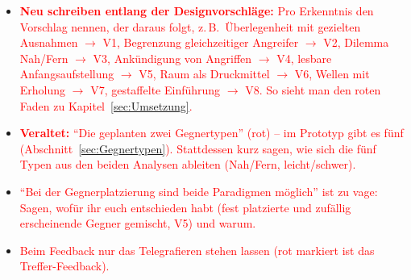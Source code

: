 \documentclass[../Main.tex]{subfiles}
\begin{document}
\begin{itemize}[leftmargin=1.5cm]
    \item \textcolor{red}{\textbf{Neu schreiben entlang der Designvorschläge:} Pro Erkenntnis den Vorschlag nennen, der daraus folgt, z.\,B.\ Überlegenheit mit gezielten Ausnahmen $\rightarrow$ V1, Begrenzung gleichzeitiger Angreifer $\rightarrow$ V2, Dilemma Nah/Fern $\rightarrow$ V3, Ankündigung von Angriffen $\rightarrow$ V4, lesbare Anfangsaufstellung $\rightarrow$ V5, Raum als Druckmittel $\rightarrow$ V6, Wellen mit Erholung $\rightarrow$ V7, gestaffelte Einführung $\rightarrow$ V8. So sieht man den roten Faden zu Kapitel~\ref{sec:Umsetzung}.}
    \item \textcolor{red}{\textbf{Veraltet:} \enquote{Die geplanten zwei Gegnertypen} (rot) -- im Prototyp gibt es fünf (Abschnitt~\ref{sec:Gegnertypen}). Stattdessen kurz sagen, wie sich die fünf Typen aus den beiden Analysen ableiten (Nah/Fern, leicht/schwer).}
    \item \textcolor{red}{\enquote{Bei der Gegnerplatzierung sind beide Paradigmen möglich} ist zu vage: Sagen, wofür ihr euch entschieden habt (fest platzierte und zufällig erscheinende Gegner gemischt, V5) und warum.}
    \item \textcolor{red}{Beim Feedback nur das Telegrafieren stehen lassen (rot markiert ist das Treffer-Feedback).}
\end{itemize}
\end{document}
